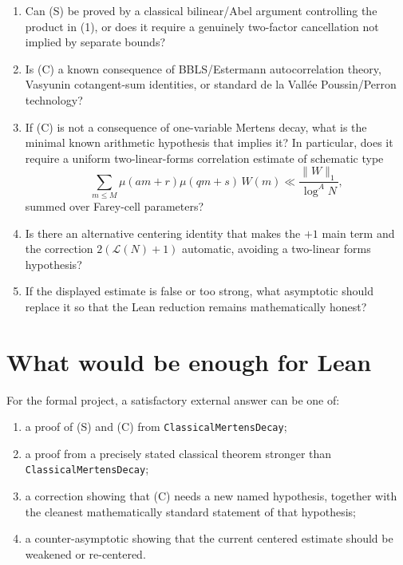\documentclass[11pt]{article}
\newcommand{\Llin}{\mathcal{L}}
\begin{document}
\begin{enumerate}[label=\textbf{Q\arabic*.},leftmargin=2.2em]
  \item Can (S) be proved by a classical bilinear/Abel argument controlling the
  product in (1), or does it require a genuinely two-factor cancellation not
  implied by separate bounds?

  \item Is (C) a known consequence of BBLS/Estermann autocorrelation theory,
  Vasyunin cotangent-sum identities, or standard de la Vall\'ee
  Poussin/Perron technology?

  \item If (C) is not a consequence of one-variable Mertens decay, what is the
  minimal known arithmetic hypothesis that implies it?  In particular, does it
  require a uniform two-linear-forms correlation estimate of schematic type
  \[
    \sum_{m\le M}
      \mu(a m+r)\mu(q m+s)\,W(m)
    \ll
    \frac{\|W\|_1}{\log^A N},
  \]
  summed over Farey-cell parameters?

  \item Is there an alternative centering identity that makes the $+1$ main
  term and the correction $2(\Llin(N)+1)$ automatic, avoiding a two-linear
  forms hypothesis?

  \item If the displayed estimate is false or too strong, what asymptotic
  should replace it so that the Lean reduction remains mathematically honest?
\end{enumerate}

\section{What would be enough for Lean}

For the formal project, a satisfactory external answer can be one of:

\begin{enumerate}[label=\textbf{A\arabic*.},leftmargin=2.2em]
  \item a proof of (S) and (C) from \texttt{ClassicalMertensDecay};
  \item a proof from a precisely stated classical theorem stronger than
  \texttt{ClassicalMertensDecay};
  \item a correction showing that (C) needs a new named hypothesis, together
  with the cleanest mathematically standard statement of that hypothesis;
  \item a counter-asymptotic showing that the current centered estimate should
  be weakened or re-centered.
\end{enumerate}
\end{document}
